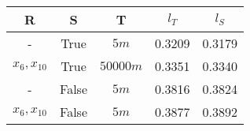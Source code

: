 \begin{tabular}{| c c | c | c c |}
\hline
R & S & T & $l_T$ & $l_S$ \\
\hline
- & True & $5m$ & 0.3209 & 0.3179 \\
$x_{6}, x_{10}$ & True & $50000m$ & 0.3351 & 0.3340 \\
- & False & $5m$ & 0.3816 & 0.3824 \\
$x_{6}, x_{10}$ & False & $5m$ & 0.3877 & 0.3892 \\
\hline
\end{tabular}
